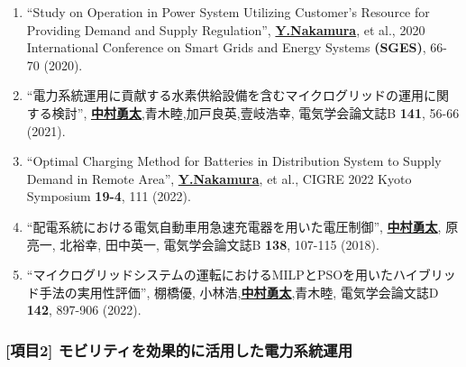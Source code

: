 \documentclass[11pt,a4paper,uplatex,dvipdfmx]{ujarticle} 		%
\newcommand{\研究課題名}{モビリティの時空間調整を活用した電力設備形成構築}
\newcommand{\研究機関名}{名古屋工業大学}
\newcommand{\研究代表者氏名}{中村勇太}
\newcommand{\研究期間の最終元号年度}{10}  %
\newcommand{\paper}[6]{%
	\item ``#1'', #2, #3 {\bf #4}, #5 (#6).			%
}
\begin{document}
	\vspace{-0.5\baselineskip}           %
	\begin{enumerate}
		\setlength{\itemsep}{-5pt}
		\paper{Study on Operation in Power System Utilizing Customer's Resource for Providing Demand and Supply Regulation}{\textbf{\ul{Y.Nakamura}}, et al.}{2020 International Conference on Smart Grids and Energy Systems}{(SGES)}{66-70}{2020}\label{pub:voltage_reg_by_bat}
		
		\paper{電力系統運用に貢献する水素供給設備を含むマイクログリッドの運用に関する検討}{\textbf{\ul{中村勇太}},青木睦,加戸良英,壹岐浩幸}{電気学会論文誌B}{141}{56-66}{2021}\label{pub:reg_vol_by_MG}

		\paper{Optimal Charging Method for Batteries in Distribution System to Supply Demand in Remote Area}{\textbf{\ul{Y.Nakamura}}, et al.}{CIGRE 2022 Kyoto Symposium}{19-4}{111}{2022}\label{pub:RA_by_bat}


	
		\paper{配電系統における電気自動車用急速充電器を用いた電圧制御}{\textbf{\ul{中村勇太}}, 原亮一, 北裕幸, 田中英一}{電気学会論文誌B}{138}{107-115}{2018}\label{pub:voltage_by_EV}


		\paper{マイクログリッドシステムの運転におけるMILPとPSOを用いたハイブリッド手法の実用性評価}{棚橋優, 小林浩,\textbf{\ul{中村勇太}},青木睦}{電気学会論文誌D}{142}{897-906}{2022}\label{pub:hybrid}
	\end{enumerate}

	\vspace{-1.5\baselineskip}           %
	\subsubsection*{\textbf{[項目2]} モビリティを効果的に活用した電力系統運用}
	\vspace{-0.5\baselineskip}           %
\end{document}
